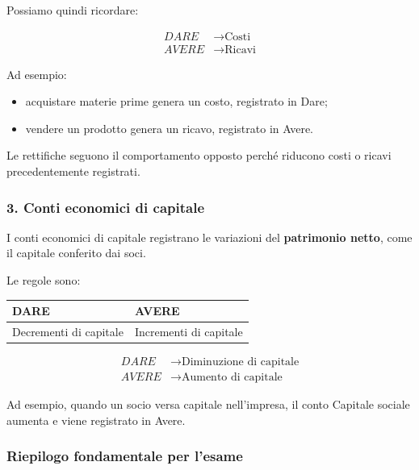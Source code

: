 \noindent Possiamo quindi ricordare:

\[
\boxed{
\begin{aligned}
DARE &\rightarrow \text{Costi}\\
AVERE &\rightarrow \text{Ricavi}
\end{aligned}
}
\]

\noindent Ad esempio:

\begin{itemize}
    \item acquistare materie prime genera
    un costo, registrato in Dare;

    \item vendere un prodotto genera
    un ricavo, registrato in Avere.
\end{itemize}

\noindent Le rettifiche seguono il comportamento
opposto perché riducono costi o ricavi
precedentemente registrati.


\subsubsection*{3. Conti economici di capitale}

\noindent I conti economici di capitale registrano
le variazioni del \textbf{patrimonio netto},
come il capitale conferito dai soci.

\medskip

\noindent Le regole sono:

\begin{center}
\begin{tabular}{|l|l|}
\hline
\textbf{DARE} & \textbf{AVERE} \\
\hline
Decrementi di capitale & Incrementi di capitale \\
\hline
\end{tabular}
\end{center}

\[
\boxed{
\begin{aligned}
DARE &\rightarrow \text{Diminuzione di capitale}\\
AVERE &\rightarrow \text{Aumento di capitale}
\end{aligned}
}
\]

\noindent Ad esempio, quando un socio versa capitale
nell'impresa, il conto Capitale sociale aumenta
e viene registrato in Avere.


\subsubsection*{Riepilogo fondamentale per l'esame}

